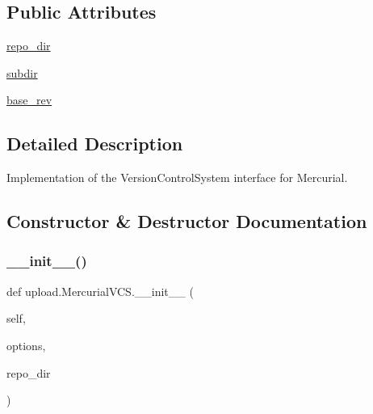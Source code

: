 \subsection*{Public Attributes}
\begin{DoxyCompactItemize}
\item 
\mbox{\hyperlink{classupload_1_1MercurialVCS_a219c1e0ab9ce864e3231913762ea489b}{repo\+\_\+dir}}
\item 
\mbox{\hyperlink{classupload_1_1MercurialVCS_a0dad32e621f5523e3430d867184f0b42}{subdir}}
\item 
\mbox{\hyperlink{classupload_1_1MercurialVCS_a41faae7820d5a015f4a42476e5e4ab8c}{base\+\_\+rev}}
\end{DoxyCompactItemize}


\subsection{Detailed Description}
\begin{DoxyVerb}Implementation of the VersionControlSystem interface for Mercurial.\end{DoxyVerb}
 

\subsection{Constructor \& Destructor Documentation}
\mbox{\label{classupload_1_1MercurialVCS_a33890f442dedbb7d9fd45c08b5baed56}} 
\subsubsection{\texorpdfstring{\_\_init\_\_()}{\_\_init\_\_()}\hspace{0.1cm}{\footnotesize\ttfamily [1/2]}}
{\footnotesize\ttfamily def upload.\+Mercurial\+V\+C\+S.\+\_\+\+\_\+init\+\_\+\+\_\+ (\begin{DoxyParamCaption}\item[{}]{self,  }\item[{}]{options,  }\item[{}]{repo\+\_\+dir }\end{DoxyParamCaption})}

\mbox{\label{classupload_1_1MercurialVCS_a33890f442dedbb7d9fd45c08b5baed56}} 
